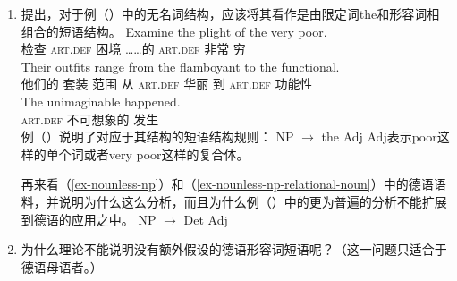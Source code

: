 {\begin{enumerate}
请在你的回答中考虑到并列的语料。请假设对称的并列结构要求其并列的短语或词具有相同的句法属性。

\item  \citet{FLGR2012a}提出，对于例（）中的无名词结构，应该将其看作是由限定词the和形容词相组合的短语结构。
\eal
\ex 
\gll Examine the plight of the very poor.\\
检查 \textsc{art}.\textsc{def} 困境 ……的 \textsc{art}.\textsc{def} 非常 穷\\
\ex 
\gll Their outfits range from the flamboyant to the functional.\\
他们的 套装 范围 从 \textsc{art}.\textsc{def} 华丽 到 \textsc{art}.\textsc{def} 功能性\\
\ex 
\gll The unimaginable happened.\\
\textsc{art}.\textsc{def} 不可想象的 发生\\
\zl
例（）说明了对应于其结构的短语结构规则：
\ea
NP $\to$ the Adj
\z
Adj表示poor这样的单个词或者very poor这样的复合体。

再来看（\ref{ex-nounless-np}）和（\ref{ex-nounless-np-relational-noun}）中的德语语料，并说明为什么这么分析，而且为什么例（）中的更为普遍的分析不能扩展到德语的应用之中。
\ea
NP $\to$ Det Adj
\z

\item 为什么\xbarc 理论不能说明没有额外假设的德语形容词短语呢？（这一问题只适合于德语母语者。）


\end{enumerate}}
